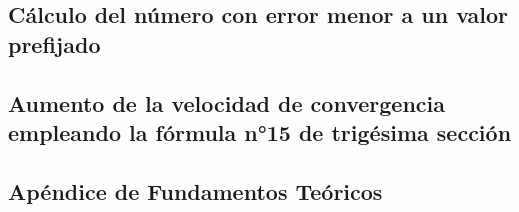 \documentclass[12pt]{article}
\begin{document}
\subsection{
  Cálculo del número \text{\Large $\pi$} con error menor a un valor prefijado
}
\lipsum[2]

\subsection{
  Aumento de la velocidad de convergencia empleando la fórmula n°15 de trigésima sección
}
\lipsum[2]

\subsection{
  Apéndice de Fundamentos Teóricos
}
\lipsum[2]
\end{document}
